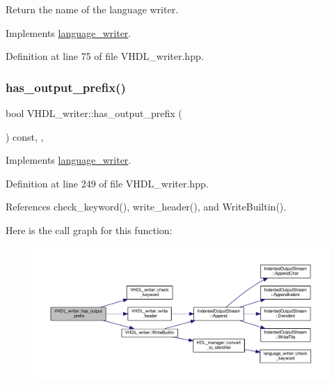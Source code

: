 Return the name of the language writer. 



Implements \hyperlink{classlanguage__writer_a6eabf4ff2972e00a392a0d2a8b4c5a3a}{language\+\_\+writer}.



Definition at line 75 of file V\+H\+D\+L\+\_\+writer.\+hpp.

\mbox{\label{structVHDL__writer_aa1655e8fca9245faa8c9bed5956d079a}} 
\subsubsection{\texorpdfstring{has\+\_\+output\+\_\+prefix()}{has\_output\_prefix()}}
{\footnotesize\ttfamily bool V\+H\+D\+L\+\_\+writer\+::has\+\_\+output\+\_\+prefix (\begin{DoxyParamCaption}{ }\end{DoxyParamCaption}) const\hspace{0.3cm}{\ttfamily [inline]}, {\ttfamily [override]}, {\ttfamily [virtual]}}



Implements \hyperlink{classlanguage__writer_a10d8bf3a0f71364bc3a72273c1172a34}{language\+\_\+writer}.



Definition at line 249 of file V\+H\+D\+L\+\_\+writer.\+hpp.



References check\+\_\+keyword(), write\+\_\+header(), and Write\+Builtin().

Here is the call graph for this function\+:
\nopagebreak
\begin{figure}[H]
\begin{center}
\leavevmode
\includegraphics[width=350pt]{d0/d0c/structVHDL__writer_aa1655e8fca9245faa8c9bed5956d079a_cgraph}
\end{center}
\end{figure}
\mbox{\label{structVHDL__writer_a8fe8a416efdb306d8f290e0a4b7faef8}} 
